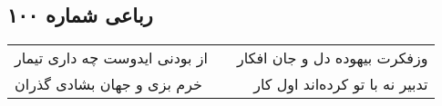 \begin{center}
\section*{رباعی شماره ۱۰۰}
\label{sec:sh100}
\begin{longtable}{l p{0.5cm} r}
از بودنی ایدوست چه داری تیمار
&&
وزفکرت بیهوده دل و جان افکار
\\
خرم بزی و جهان بشادی گذران
&&
تدبیر نه با تو کرده‌اند اول کار
\\
\end{longtable}
\end{center}
